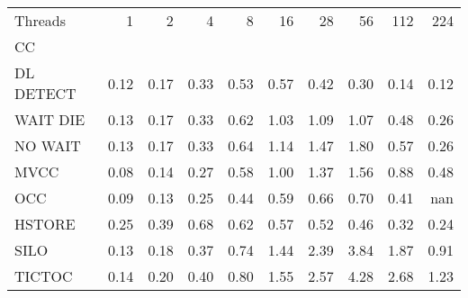 \begin{tabular}{lrrrrrrrrr}
\toprule
Threads &  1   &  2   &  4   &  8   &  16  &  28  &  56  &  112 &  224 \\
CC        &      &      &      &      &      &      &      &      &      \\
\midrule
DL DETECT & 0.12 & 0.17 & 0.33 & 0.53 & 0.57 & 0.42 & 0.30 & 0.14 & 0.12 \\
WAIT DIE  & 0.13 & 0.17 & 0.33 & 0.62 & 1.03 & 1.09 & 1.07 & 0.48 & 0.26 \\
NO WAIT   & 0.13 & 0.17 & 0.33 & 0.64 & 1.14 & 1.47 & 1.80 & 0.57 & 0.26 \\
MVCC      & 0.08 & 0.14 & 0.27 & 0.58 & 1.00 & 1.37 & 1.56 & 0.88 & 0.48 \\
OCC       & 0.09 & 0.13 & 0.25 & 0.44 & 0.59 & 0.66 & 0.70 & 0.41 &  nan \\
HSTORE    & 0.25 & 0.39 & 0.68 & 0.62 & 0.57 & 0.52 & 0.46 & 0.32 & 0.24 \\
SILO      & 0.13 & 0.18 & 0.37 & 0.74 & 1.44 & 2.39 & 3.84 & 1.87 & 0.91 \\
TICTOC    & 0.14 & 0.20 & 0.40 & 0.80 & 1.55 & 2.57 & 4.28 & 2.68 & 1.23 \\
\bottomrule
\end{tabular}
